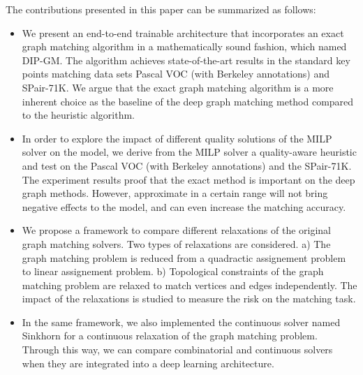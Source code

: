 \documentclass[times,onecolumn,final,authoryear]{article}
\theoremstyle{definition}
\begin{document}
The contributions presented in this paper can be summarized as follows:
\begin{itemize}
    \item We present an end-to-end trainable architecture that incorporates an exact graph matching algorithm in a mathematically sound fashion, which named DIP-GM. The algorithm achieves state-of-the-art results in the standard key points matching data sets Pascal VOC\cite{bourdev2009poselets,everingham2010pascal} (with Berkeley annotations) and SPair-71K\cite{min2019spair}. We argue that the exact graph matching algorithm is a more inherent choice as the baseline of the deep graph matching method compared to the heuristic algorithm.
    
    \item In order to explore the impact of different quality solutions of the MILP solver on the model, we derive from the MILP solver a quality-aware heuristic and test on the Pascal VOC (with Berkeley annotations\cite{bourdev2009poselets,everingham2010pascal}) and the SPair-71K\cite{min2019spair}. The experiment results proof that the exact method is important on the deep graph methods. However, approximate in a certain range will not bring negative effects to the model, and can even increase the matching accuracy.
    
    \item We propose a framework to compare different relaxations of the original graph matching solvers. Two types of relaxations are considered. a) The graph matching problem is reduced from a quadractic assignement problem to linear assignement problem. b) Topological constraints of the graph matching problem are relaxed to match vertices and edges independently. The impact of the relaxations is studied to measure the risk on the matching task. %
    
    \item In the same framework, we also implemented the continuous solver named Sinkhorn \cite{SinkhornAlgo} for a continuous relaxation of the graph matching problem. Through this way, we can compare combinatorial and continuous solvers when they are integrated into a deep learning architecture. 
\end{itemize}
\end{document}
